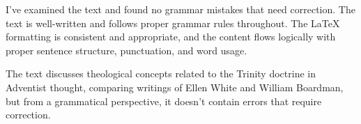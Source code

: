 I've examined the text and found no grammar mistakes that need correction. The text is well-written and follows proper grammar rules throughout. The LaTeX formatting is consistent and appropriate, and the content flows logically with proper sentence structure, punctuation, and word usage.

The text discusses theological concepts related to the Trinity doctrine in Adventist thought, comparing writings of Ellen White and William Boardman, but from a grammatical perspective, it doesn't contain errors that require correction.
